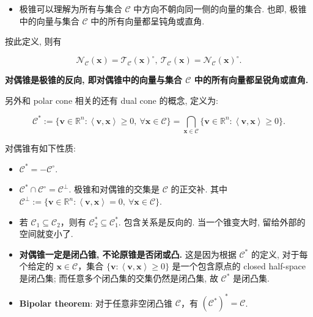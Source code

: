 \begin{itemize}
\item {}极锥可以理解为所有与集合 $\mathcal{C}$ 中方向不朝向同一侧的向量的集合. 也即, 极锥中的向量与集合 $\mathcal{C}$ 中的所有向量都呈钝角或直角.


\end{itemize}

按此定义, 则有

\[
\mathcal{N}_{\mathcal{C}}(\bm{x}) = \mathcal{T}_{\mathcal{C}}(\bm{x})^\circ,~ \mathcal{T}_{\mathcal{C}}(\bm{x}) = \mathcal{N}_{\mathcal{C}}(\bm{x})^\circ.
\]

\textbf{对偶锥是极锥的反向, 即对偶锥中的向量与集合 $\mathcal{C}$ 中的所有向量都呈锐角或直角.}


\begin{defblock}
另外和 polar cone 相关的还有 dual cone 的概念, 定义为:

\[
\mathcal{C}^* := \{\bm{v} \in \mathbb{R}^n: \left\langle \bm{v}, \bm{x} \right\rangle \geq 0,~ \forall \bm{x} \in \mathcal{C}\} = \bigcap_{\bm{x} \in \mathcal{C}} \{\bm{v} \in \mathbb{R}^n: \left\langle \bm{v}, \bm{x} \right\rangle \geq 0\}.
\]

\end{defblock}


\begin{propositionblock}
对偶锥有如下性质:

\begin{itemize}
\item {}$\mathcal{C}^* = - \mathcal{C}^\circ$.


\item {}$\mathcal{C}^* \cap \mathcal{C}^\circ = \mathcal{C}^\perp$. 极锥和对偶锥的交集是 $\mathcal{C}$ 的正交补. 其中 $\mathcal{C}^\perp := \{\bm{v} \in \mathbb{R}^n: \left\langle \bm{v}, \bm{x} \right\rangle = 0,~ \forall \bm{x} \in \mathcal{C}\}$.


\item {}若 $\mathcal{C}_1 \subseteq \mathcal{C}_2$，则有 $\mathcal{C}_2^* \subseteq \mathcal{C}_1^*$. 包含关系是反向的.  当一个锥变大时, 留给外部的空间就变小了.


\item {}\textbf{对偶锥一定是闭凸锥, 不论原锥是否闭或凸.} 这是因为根据 $\mathcal{C}^*$ 的定义, 对于每个给定的 $\bm{x} \in \mathcal{C}$，集合 $\{\bm{v}: \left\langle \bm{v}, \bm{x} \right\rangle \geq 0\}$ 是一个包含原点的 closed half-space 是闭凸集; 而任意多个闭凸集的交集仍然是闭凸集, 故 $\mathcal{C}^*$ 是闭凸集.


\item {}\textbf{Bipolar theorem}: 对于任意非空闭凸锥 $\mathcal{C}$，有 $(\mathcal{C}^*)^* = \mathcal{C}$.


\end{itemize}

\end{propositionblock}

